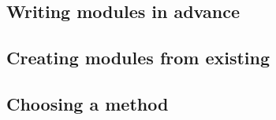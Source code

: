 

\subsection{Writing modules in advance}


\subsection{Creating modules from existing \gdcases{}}


\subsection{Choosing a method}

